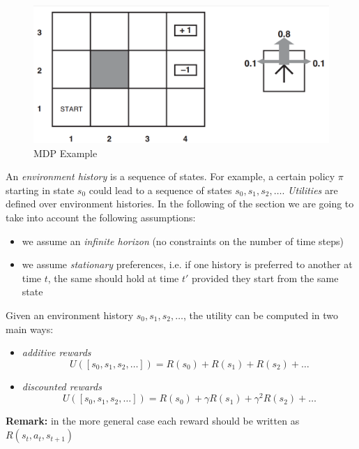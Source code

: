 \begin{figure}
    \centering
    \includegraphics[width=\textwidth]{images/mdpExample.png}
    \caption{MDP Example}
    \label{fig:mdpExample}
\end{figure}

An \textit{environment history} is a sequence of states. For example, a certain policy $\pi$ starting in state $s_0$ could lead to a sequence of states $s_0, s_1, s_2, \hdots$. \textit{Utilities} are defined over environment histories. In the following of the section we are going to take into account the following assumptions:
\begin{itemize}
    \item we assume an \textit{infinite horizon} (no constraints on the number of time steps)
    
    \item we assume \textit{stationary} preferences, i.e. if one history is preferred to another at time $t$, the same should hold at time $t'$ provided they start from the same state
\end{itemize}

Given an environment history $s_0, s_1, s_2, \hdots$, the utility can be computed in two main ways:
\begin{itemize}
    \item \textit{additive rewards}
    \begin{equation}
        U([s_0, s_1, s_2, \hdots]) = R(s_0) + R(s_1) + R(s_2) + \hdots
    \end{equation}
    \item \textit{discounted rewards}
    \begin{equation}
        U([s_0, s_1, s_2, \hdots]) = R(s_0) + \gamma R(s_1) + \gamma^2 R(s_2) + \hdots
    \end{equation}
\end{itemize}

\textbf{Remark:} in the more general case each reward should be written as $R(s_t, a_t, s_{t+1})$ \newline

